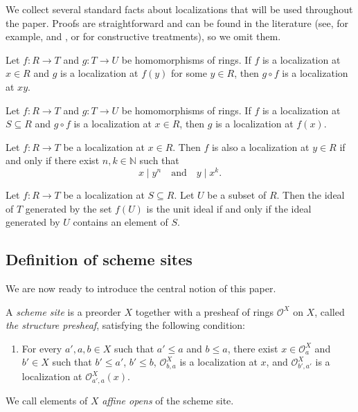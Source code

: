 \documentclass[reqno]{amsart}
\newcommand{\axitem}[1]{\phantomsection \label{ax:#1}}
\theoremstyle{definition}
\theoremstyle{remark}
\numberwithin{figure}{section}
\begin{document}
We collect several standard facts about localizations that will be used throughout the paper.
Proofs are straightforward and can be found in the literature (see, for example, \cite[Chapter~3]{atiyah-macdonald} and \cite[Tag~00CM]{stacks}, or \cite{constructive-algebra,cacm} for constructive treatments), so we omit them.

\begin{lem}
Let $f : R \to T$ and $g : T \to U$ be homomorphisms of rings.
If $f$ is a localization at $x \in R$ and $g$ is a localization at $f(y)$ for some $y \in R$, then $g \circ f$ is a localization at $x y$.
\end{lem}

\begin{lem}
Let $f : R \to T$ and $g : T \to U$ be homomorphisms of rings.
If $f$ is a localization at $S \subseteq R$ and $g \circ f$ is a localization at $x \in R$, then $g$ is a localization at $f(x)$.
\end{lem}

\begin{lem}
Let $f : R \to T$ be a localization at $x \in R$.
Then $f$ is also a localization at $y \in R$ if and only if there exist $n,k \in \mathbb{N}$ such that
\[ x \mid y^n \quad \text{and} \quad y \mid x^k. \]
\end{lem}

\begin{lem}
Let $f : R \to T$ be a localization at $S \subseteq R$.
Let $U$ be a subset of $R$.
Then the ideal of $T$ generated by the set $f(U)$ is the unit ideal if and only if the ideal generated by $U$ contains an element of $S$.
\end{lem}

\subsection{Definition of scheme sites}

We are now ready to introduce the central notion of this paper.

\begin{defn}
A \emph{scheme site} is a preorder $X$ together with a presheaf of rings $\mathcal{O}^X$ on $X$, called \emph{the structure presheaf}, satisfying the following condition:
\begin{enumerate}
\item[(SC)] \axitem{SC} For every $a',a,b \in X$ such that $a' \leq a$ and $b \leq a$, there exist $x \in \mathcal{O}^X_a$ and $b' \in X$ such that
    $b' \leq a'$, $b' \leq b$, $\mathcal{O}^X_{b,a}$ is a localization at $x$, and $\mathcal{O}^X_{b',a'}$ is a localization at $\mathcal{O}^X_{a',a}(x)$.
\end{enumerate}
We call elements of $X$ \emph{affine opens} of the scheme site.
\end{defn}
\end{document}
